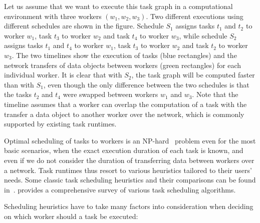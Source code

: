 Let us assume that we want to execute this task graph in a computational environment with three
workers $(w_1, w_2, w_3)$. Two different executions using different schedules are shown in the
figure. Schedule $S_1$ assigns tasks $t_1$ and
$t_2$ to worker $w_1$, task $t_3$ to worker
$w_2$ and task $t_4$ to worker $w_3$, while
schedule $S_2$ assigns tasks $t_1$ and $t_4$ to
worker $w_1$, task $t_3$ to worker $w_2$ and
task $t_2$ to worker $w_3$. The two timelines show the execution
of tasks (blue rectangles) and the network transfers of data objects between workers (green
rectangles) for each individual worker. It is clear that with $S_2$, the task
graph will be computed faster than with $S_1$, even though the only difference
between the two schedules is that the tasks $t_2$ and $t_4$ were
swapped between workers $w_1$ and $w_3$. Note that the timeline
assumes that a worker can overlap the computation of a task with the transfer a data object to
another worker over the network, which is commonly supported by existing task runtimes.

Optimal scheduling of tasks to workers is an NP-hard~\cite{Ullman1975} problem even for the
most basic scenarios, when the exact execution duration of each task is known, and even if we do
not consider the duration of transferring data between workers over a network. Task runtimes thus
resort to various heuristics tailored to their users' needs. Some classic task scheduling
heuristics and their comparisons can be found in~\cite{estee,hlfet1974,kwok1998benchmarking,hagras2003static,wang2018list}. 
provides a comprehensive survey of various task scheduling algorithms.

Scheduling heuristics have to take many factors into consideration when deciding on which worker
should a task be executed:

